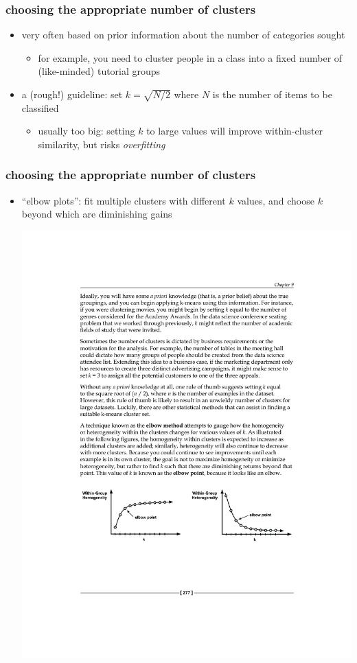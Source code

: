 \documentclass{beamer}
\begin{document}
\begin{frame}
	\frametitle{choosing the appropriate number of clusters}
	\begin{itemize}
		\item very often based on prior information about the number of
		categories sought
		\begin{itemize}
			\item for example, you need to cluster people in a class into a
			fixed number of (like-minded) tutorial groups
		\end{itemize}
		\item a (rough!) guideline: set $k = \sqrt{N/2}$ where $N$ is the
		number of items to be classified
		\begin{itemize}
			\item usually too big: setting $k$ to large values will improve within-cluster
			similarity, but risks \emph{overfitting}
		\end{itemize}
	\end{itemize}
\end{frame}

\begin{frame}
	\frametitle{choosing the appropriate number of clusters}
	\begin{itemize}
		\item ``elbow plots'': fit multiple clusters with different $k$
		values, and choose $k$ beyond which are diminishing gains
		\vspace*{3ex}
		
		\hspace*{-1.4cm}
		\includegraphics[width=1.1\textwidth]{figures/elbowplots.pdf}
	\end{itemize}
\end{frame}
\end{document}
